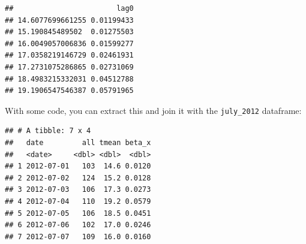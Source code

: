 \documentclass[
]{book}
\newenvironment{Shaded}{\begin{snugshade}}{\end{snugshade}}
\newcommand{\DataTypeTok}[1]{\textcolor[rgb]{0.13,0.29,0.53}{#1}}
\newcommand{\DecValTok}[1]{\textcolor[rgb]{0.00,0.00,0.81}{#1}}
\newcommand{\KeywordTok}[1]{\textcolor[rgb]{0.13,0.29,0.53}{\textbf{#1}}}
\newcommand{\NormalTok}[1]{#1}
\newcommand{\OperatorTok}[1]{\textcolor[rgb]{0.81,0.36,0.00}{\textbf{#1}}}
\newcommand{\StringTok}[1]{\textcolor[rgb]{0.31,0.60,0.02}{#1}}
\begin{document}
\begin{Shaded}
\end{Shaded}

\begin{verbatim}
##                        lag0
## 14.6077699661255 0.01199433
## 15.190845489502  0.01275503
## 16.0049057006836 0.01599277
## 17.0358219146729 0.02461931
## 17.2731075286865 0.02731069
## 18.4983215332031 0.04512788
## 19.1906547546387 0.05791965
\end{verbatim}

With some code, you can extract this and join it with the \texttt{july\_2012} dataframe:

\begin{Shaded}
\end{Shaded}

\begin{verbatim}
## # A tibble: 7 x 4
##   date         all tmean beta_x
##   <date>     <dbl> <dbl>  <dbl>
## 1 2012-07-01   103  14.6 0.0120
## 2 2012-07-02   124  15.2 0.0128
## 3 2012-07-03   106  17.3 0.0273
## 4 2012-07-04   110  19.2 0.0579
## 5 2012-07-05   106  18.5 0.0451
## 6 2012-07-06   102  17.0 0.0246
## 7 2012-07-07   109  16.0 0.0160
\end{verbatim}
\end{document}
